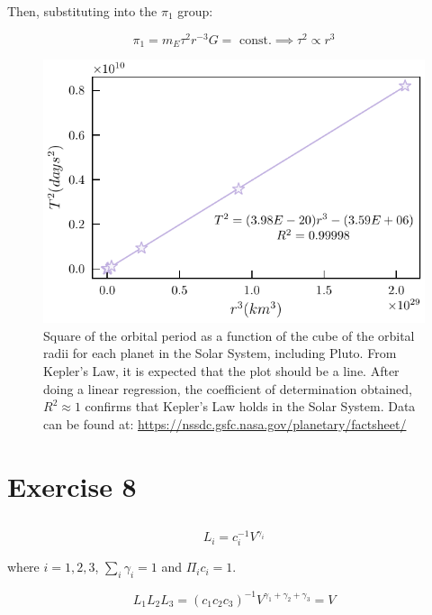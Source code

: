 \documentclass{article}
\begin{document}
Then, substituting into the $\pi_1$ group:

\[ \pi_1 = m_E\tau^{2}r^{-3}G =  \text{ const.} \implies \tau^2 \propto r^3 \]


\begin{figure}[h!]
  \includegraphics[width=\linewidth]{Q07/keplerLawPlot.pdf}
  \caption{Square of the orbital period as a function of the cube of the orbital radii for each planet in the Solar System, including Pluto. From Kepler's Law, it is expected that the plot should be a line. After doing a linear regression, the coefficient of determination obtained, $R^2 \approx 1$ confirms that Kepler's Law holds in the Solar System. Data can be found at: \url{https://nssdc.gsfc.nasa.gov/planetary/factsheet/}} 
  \label{fig:keplerLawPlot}
\end{figure}

\section{Exercise 8}

\subsection{}

\[ L_i = c_i^{-1}V^{\gamma_i}\]

where $i={1,2,3}$, $\sum_i \gamma_i = 1$ and $\Pi_i c_i = 1$.

\[ L_1 L_2 L_3 = (c_1c_2c_3)^{-1} V ^{\gamma_1 + \gamma_2 + \gamma_3} = V\] \\

\subsection{}
\end{document}

